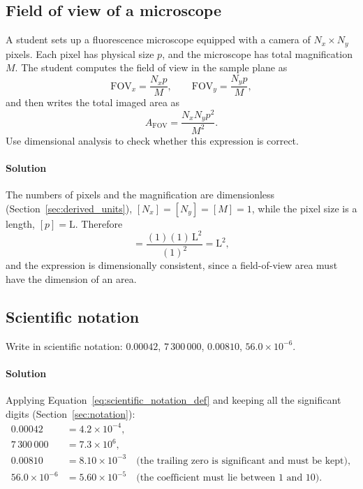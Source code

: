 \subsection{Field of view of a microscope}
\label{ex:fov}

A student sets up a fluorescence microscope equipped with a camera of $N_x \times N_y$ pixels. Each pixel has physical size $p$, and the microscope has total magnification $M$. The student computes the field of view in the sample plane as
\begin{equation*}
\text{FOV}_x = \frac{N_x p}{M}, \qquad \text{FOV}_y = \frac{N_y p}{M},
\end{equation*}
and then writes the total imaged area as
\begin{equation*}
A_{\text{FOV}} = \frac{N_x N_y p^2}{M^2}.
\end{equation*}
Use dimensional analysis to check whether this expression is correct.

\paragraph{Solution} The numbers of pixels and the magnification are dimensionless (Section~\ref{sec:derived_units}), $[N_x] = [N_y] = [M] = 1$, while the pixel size is a length, $[p] = \text{L}$. Therefore
\begin{equation*}
[A_{\text{FOV}}] = \frac{(1)(1)\,\text{L}^2}{(1)^2} = \text{L}^2,
\end{equation*}
and the expression is dimensionally consistent, since a field-of-view area must have the dimension of an area.

\subsection{Scientific notation}
\label{ex:scientific_notation}

Write in scientific notation: $0.00042$, $7\,300\,000$, $0.00810$, $56.0 \times 10^{-6}$.

\paragraph{Solution} Applying Equation~\eqref{eq:scientific_notation_def} and keeping all the significant digits (Section~\ref{sec:notation}):
\begin{align*}
0.00042 &= 4.2 \times 10^{-4}, \\
7\,300\,000 &= 7.3 \times 10^{6}, \\
0.00810 &= 8.10 \times 10^{-3} \quad \text{(the trailing zero is significant and must be kept)}, \\
56.0 \times 10^{-6} &= 5.60 \times 10^{-5} \quad \text{(the coefficient must lie between 1 and 10)}.
\end{align*}

